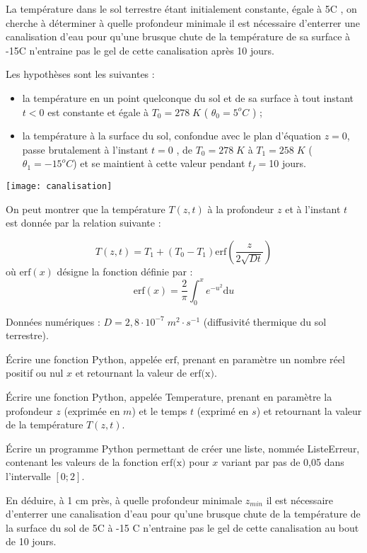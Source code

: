 La température dans le sol terrestre étant initialement constante, égale à 5\textdegree C , on cherche à déterminer
à quelle profondeur minimale il est nécessaire d'enterrer une canalisation d'eau pour qu'une brusque
chute de la température de sa surface à -15\textdegree C n'entraine pas le gel de cette canalisation après 10 jours.



\begin{minipage}[c]{.6\linewidth}
Les hypothèses sont les suivantes :
\begin{itemize}
\item la température en un point quelconque du sol et de sa surface à tout instant $t < 0$ est constante et égale à $T_0=278\;K$ ( $\theta_0=5^oC$ ) ;
\item la température à la surface du sol, confondue avec le plan d'équation $z = 0$, passe brutalement à l'instant $t = 0$ , de $T_0 = 278\;K$ à $T_1 =  258\; K$ ($\theta_1 = -15^o C$) et se maintient à cette valeur pendant
$t_f= $10 jours.
\end{itemize}
\end{minipage}\hfill
\begin{minipage}[c]{.35\linewidth}
\begin{center}
\texttt{[image: canalisation]}
\end{center}
\end{minipage}

On peut montrer que la température $T(z, t)$ à la profondeur $z$ et à l'instant $t$ est donnée par la relation suivante :

$$
T(z,t)=T_1 + (T_0-T_1) \text{erf}\left( \dfrac{z}{2\sqrt{Dt}} \right)
$$
où $\text{erf}(x)$ désigne la fonction définie par :
$$
\text{erf}(x) = \dfrac{2}{\pi}\int^x_0 e^{-u^2} \mathrm{d}u
$$

Données numériques : $D=2,8\cdot 10^{-7} \; m^2\cdot s^{-1}$ (diffusivité thermique du sol terrestre).


\question{} Écrire une fonction Python, appelée $\text{erf}$, prenant en paramètre un nombre réel positif ou nul $x$ et
retournant la valeur de $\text{erf(x)}$.

\question{} Écrire une fonction Python, appelée Temperature, prenant en paramètre la profondeur $z$ (exprimée
en $m$) et le temps $t$ (exprimé en $s$) et retournant la valeur de la température $T(z, t)$.

\question{} Écrire un programme Python permettant de créer une liste, nommée ListeErreur, contenant les
valeurs de la fonction $\text{erf(x)}$ pour $x$ variant par pas de 0,05 dans l'intervalle $[0 ; 2]$.

\question{} En déduire, à 1 cm près, à quelle profondeur minimale $z_{min}$ il est nécessaire d'enterrer une
canalisation d'eau pour qu'une brusque chute de la température de la surface du sol de 5\textdegree C à -15 \textdegree C
n'entraine pas le gel de cette canalisation au bout de 10 jours.